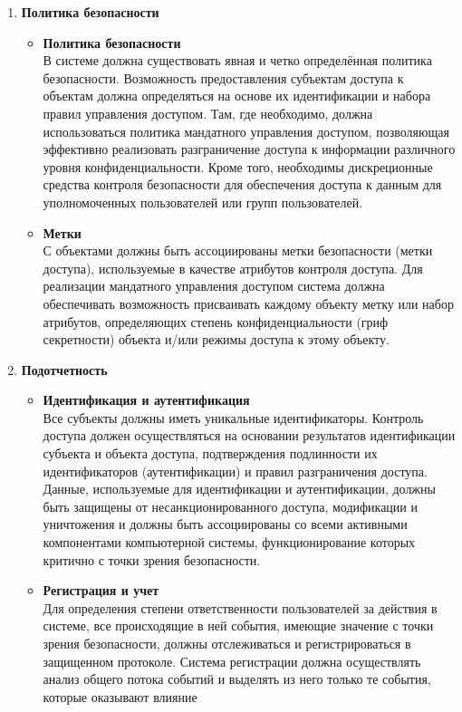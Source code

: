 \begin{enumerate}
	\item \textbf{Политика безопасности}
	\begin{itemize}
		\item \textbf{Политика безопасности}\\
		В системе должна существовать явная и четко определённая политика безопасности. Возможность предоставления субъектам доступа к объектам должна определяться на основе
		их идентификации и набора правил управления доступом. Там, где необходимо, должна использоваться политика мандатного управления доступом, позволяющая эффективно реализовать
		разграничение доступа к информа­ции различного уровня конфиденциальности. Кроме того, необходимы дискреционные средства контроля безопасности для обеспечения доступа к данным для
		уполномоченных пользователей или групп пользователей.
		\item \textbf{Метки}\\
		С объектами должны быть ассоциированы метки безопасности (метки доступа), используемые в качестве атрибутов контроля доступа. Для реализации мандатного управления доступом система 
		должна обеспечивать возможность присваивать каждому объекту метку или набор атрибутов, определяющих  степень конфиденциальности (гриф секретности) объекта и/или режимы доступа к 
		этому объекту.
	\end{itemize}
	\item \textbf{Подотчетность}
	\begin{itemize}
		\item \textbf{Идентификация и аутентификация}\\
		Все субъекты должны иметь уникальные идентификаторы. Контроль доступа должен осуществляться на основании результатов идентификации субъекта и объекта доступа, подтверждения 
		подлинности их идентификаторов (аутентификации) и правил разграничения доступа. Данные, используемые для идентификации и аутентификации, должны быть защищены от несанкционированного 
		доступа, модификации и уничтожения и должны быть ассоциированы со всеми активными компонентами компьютерной системы, функционирование которых критично с точки зрения безопасности.
		\item \textbf{Регистрация и учет}\\
		Для определения степени ответственности пользователей за действия в системе, все происходящие в ней события, имеющие значение с точки зрения безопасности, должны отслеживаться и 
		регистрироваться в защищенном протоколе. Система регистрации должна осуществлять анализ общего потока событий и выделять из него только те события, которые оказывают влияние 

\end{itemize}
\end{enumerate}
